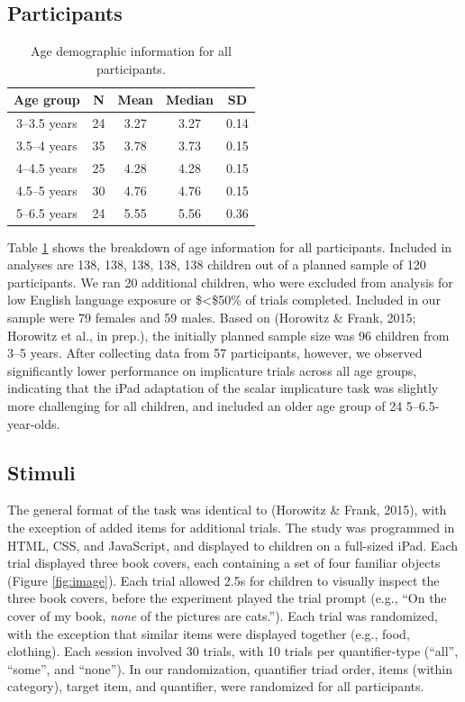 \documentclass[10pt, letterpaper]{article}
\begin{document}
\subsection{Participants}\label{participants}

\begin{table}
\centering
\begin{tabular}{c c c c c } 
 \hline
 Age group & N & Mean & Median & SD \\
 \hline
 3--3.5 years & 24 & 3.27 & 3.27 & 0.14\\
 \hline
 3.5--4 years & 35 & 3.78 & 3.73 & 0.15 \\ 
 \hline
 4--4.5 years & 25 & 4.28 & 4.28 & 0.15\\
 \hline
 4.5--5 years & 30 & 4.76 & 4.76 & 0.15 \\
 \hline
 5--6.5 years & 24 & 5.55 & 5.56 & 0.36 \\
 \hline
\end{tabular}
\caption{Age demographic information for all participants.}
\label{tab:age}
\end{table}

Table \ref{tab:age} shows the breakdown of age information for all
participants. Included in analyses are 138, 138, 138, 138, 138 children
out of a planned sample of 120 participants. We ran 20 additional
children, who were excluded from analysis for low English language
exposure or \$\textless{}\$50\% of trials completed. Included in our
sample were 79 females and 59 males. Based on (Horowitz \& Frank, 2015;
Horowitz et al., in prep.), the initially planned sample size was 96
children from 3--5 years. After collecting data from 57 participants,
however, we observed significantly lower performance on implicature
trials across all age groups, indicating that the iPad adaptation of the
scalar implicature task was slightly more challenging for all children,
and included an older age group of 24 5--6.5-year-olds.

\subsection{Stimuli}\label{stimuli}

The general format of the task was identical to (Horowitz \& Frank,
2015), with the exception of added items for additional trials. The
study was programmed in HTML, CSS, and JavaScript, and displayed to
children on a full-sized iPad. Each trial displayed three book covers,
each containing a set of four familiar objects (Figure \ref{fig:image}).
Each trial allowed 2.5s for children to visually inspect the three book
covers, before the experiment played the trial prompt (e.g., ``On the
cover of my book, \emph{none} of the pictures are cats.''). Each trial
was randomized, with the exception that similar items were displayed
together (e.g., food, clothing). Each session involved 30 trials, with
10 trials per quantifier-type (``all'', ``some'', and ``none''). In our
randomization, quantifier triad order, items (within category), target
item, and quantifier, were randomized for all participants.
\end{document}
